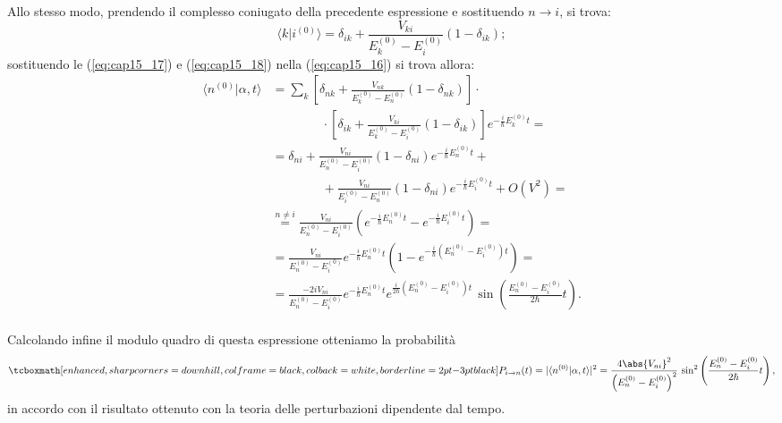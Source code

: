 Allo stesso modo, prendendo il complesso coniugato della precedente espressione e sostituendo $n\rightarrow i $, si trova:
	\begin{equation}
		\langle k\vert i^{(0)}  \rangle  = \delta _{ik} + \frac{V_{ki}}{E_k ^{(0)} - E_i ^{(0)}}\left( 1-\delta _{ik} \right);
	\label{eq:cap15_18}	
	\end{equation}
sostituendo le (\ref{eq:cap15_17}) e (\ref{eq:cap15_18}) nella (\ref{eq:cap15_16}) si trova allora:
	\begin{align}
		\langle n ^{(0)}\vert \alpha , t \rangle &= \sum _ k \left[ \delta _{nk} + \frac{V_{nk}}{E_k ^{(0)}- E_n ^{(0)}} \left(1-\delta _{nk} \right)\right]\cdot \nonumber \\
		&\qquad\qquad \cdot \left[ \delta _{ik} + \frac{V_{ki}}{E_k ^{(0)}- E_i ^{(0)}} \left(1-\delta _{ik} \right)\right] e^{-\frac{i}{\hbar} E_k ^{(0)} t} = \nonumber \\
		&= \delta_{ni} +\frac{V_{ni}}{E_n ^{(0)} -E_i ^{(0)}}\left(1-\delta_{ni} \right) e^{-\frac{i}{\hbar} E_n ^{(0)} t}+ \nonumber \\
		&\qquad \qquad	+\frac{V_{ni}}{E_i ^{(0)} -E_n ^{(0)}}\left(1-\delta_{ni} \right) e^{-\frac{i}{\hbar} E_i ^{(0)} t}+ O(V^2) = \nonumber \\
		& \overset{ n\neq i}{=}\frac{V_{ni}}{E_n ^{(0)} -E_i ^{(0)}} \left(e^{-\frac{i}{\hbar} E_n ^{(0)} t} -e^{-\frac{i}{\hbar} E_i ^{(0)} t}\right) = \nonumber \\
		&= \frac{V_{ni}}{E_n ^{(0)} -E_i ^{(0)}}e^{-\frac{i}{\hbar} E_n ^{(0)} t}\left( 1- e^{-\frac{i}{\hbar} \left(E_n ^{(0)}- E_i ^{(0)}\right) t}\right) = \nonumber \\
&= \frac{-2iV_{ni}}{E_n ^{(0)} -E_i ^{(0)}}e^{-\frac{i}{\hbar} E_n ^{(0)} t}  e^{\frac{i}{2\hbar} \left( E_n ^{(0)} -E_i ^{(0)}\right)t} \, \sin \left( \frac{ E_n ^{(0)} -E_i ^{(0)}}{2\hbar}t \right).
	\end{align}\\
	
Calcolando infine il modulo quadro di questa espressione otteniamo la probabilità
	\begin{equation}
		\tcboxmath[enhanced, sharp corners=downhill, colframe=black, colback=white, borderline={2pt}{-3pt}{black}]{
			P_{i\rightarrow n} (t) = 	\vert\langle n ^{(0)}\vert \alpha , t \rangle \vert ^2 = \frac{4\abs{V_{ni}}^2 }{\left(E_n ^{(0)} -E_i ^{(0)}\right) ^2}\,\sin ^2\left( \frac{ E_n ^{(0)} -E_i ^{(0)}}{2\hbar}t \right),
			}
	\end{equation}
in accordo con il risultato ottenuto con la teoria delle perturbazioni dipendente dal tempo.
